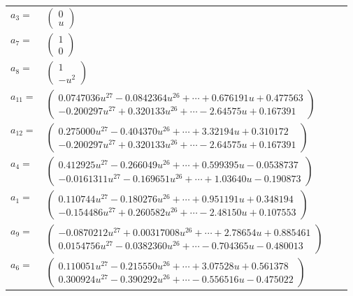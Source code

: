 \documentclass[1p]{elsarticle_modified}
\theoremstyle{definition}
\begin{document}
\begin{tabular}{m{7pt} m{180pt} m{7pt} m{180pt} }
\flushright $a_{3}=$&$\begin{pmatrix}0\\u\end{pmatrix}$ \\
\flushright $a_{7}=$&$\begin{pmatrix}1\\0\end{pmatrix}$ \\
\flushright $a_{8}=$&$\begin{pmatrix}1\\- u^2\end{pmatrix}$ \\
\flushright $a_{11}=$&$\begin{pmatrix}0.0747036 u^{27}-0.0842364 u^{26}+\cdots+0.676191 u+0.477563\\-0.200297 u^{27}+0.320133 u^{26}+\cdots-2.64575 u+0.167391\end{pmatrix}$ \\
\flushright $a_{12}=$&$\begin{pmatrix}0.275000 u^{27}-0.404370 u^{26}+\cdots+3.32194 u+0.310172\\-0.200297 u^{27}+0.320133 u^{26}+\cdots-2.64575 u+0.167391\end{pmatrix}$ \\
\flushright $a_{4}=$&$\begin{pmatrix}0.412925 u^{27}-0.266049 u^{26}+\cdots+0.599395 u-0.0538737\\-0.0161311 u^{27}-0.169651 u^{26}+\cdots+1.03640 u-0.190873\end{pmatrix}$ \\
\flushright $a_{1}=$&$\begin{pmatrix}0.110744 u^{27}-0.180276 u^{26}+\cdots+0.951191 u+0.348194\\-0.154486 u^{27}+0.260582 u^{26}+\cdots-2.48150 u+0.107553\end{pmatrix}$ \\
\flushright $a_{9}=$&$\begin{pmatrix}-0.0870212 u^{27}+0.00317008 u^{26}+\cdots+2.78654 u+0.885461\\0.0154756 u^{27}-0.0382360 u^{26}+\cdots-0.704365 u-0.480013\end{pmatrix}$ \\
\flushright $a_{6}=$&$\begin{pmatrix}0.110051 u^{27}-0.215550 u^{26}+\cdots+3.07528 u+0.561378\\0.300924 u^{27}-0.390292 u^{26}+\cdots-0.556516 u-0.475022\end{pmatrix}$ \\

\end{tabular}
\end{document}
